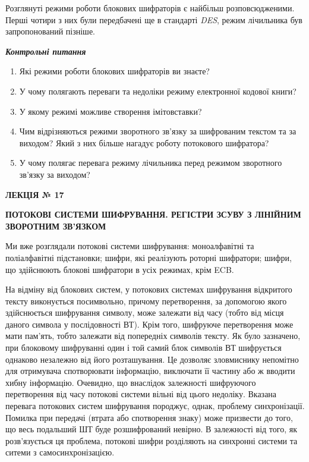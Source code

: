 \bigskip

Розглянуті режими роботи блокових шифраторів є найбільш розповсюдженими. Перші
чотири з них були передбачені ще в стандарті \textit{DES}, режим
лічильника\textit{ }був запропонований пізніше.


\bigskip


\bigskip

{\centering\bfseries\itshape
Контрольні питання
\par}


\bigskip


\bigskip

\liststyleWWviiiNumxx
\begin{enumerate}
\item Які режими роботи блокових шифраторів ви знаєте?
\item У чому полягають переваги та недоліки режиму електронної кодової книги?
\item У якому режимі можливе створення імітовставки?
\item Чим відрізняються режими зворотного зв’язку за шифрованим текстом та за
виходом? Який з них більше нагадує роботу потокового шифратора?
\item У чому полягає перевага режиму лічильника перед режимом  зворотного
зв’язку за виходом?
\end{enumerate}

\bigskip


\bigskip


\bigskip


\bigskip

{\bfseries
ЛЕКЦІЯ № 17}


\bigskip

{\centering\bfseries
ПОТОКОВІ  СИСТЕМИ  ШИФРУВАННЯ.  РЕГІСТРИ ЗСУВУ  З  ЛІНІЙНИМ  ЗВОРОТНИМ  ЗВ’ЯЗКОМ
\par}


\bigskip


\bigskip

Ми вже розглядали потокові системи шифрування: моноалфавітні та поліалфавітні
підстановки; шифри, які реалізують роторні шифратори; шифри, що здійснюють
блокові шифратори в  усіх режимах, крім ECB.

На відміну від блокових систем, у потокових системах шифрування відкритого
тексту виконується посимвольно, причому перетворення, за допомогою якого
здійснюється шифрування символу, може залежати від часу (тобто від місця даного
символа у послідовності ВТ). Крім того, шифруюче перетворення може мати
пам’ять, тобто залежати від попередніх символів тексту. Як було зазначено, при
блоковому шифруванні один і той самий блок символів ВТ шифрується однаково
незалежно від його розташування. Це дозволяє зловмиснику непомітно для
отримувача спотворювати інформацію, виключати її частину або ж вводити хибну
інформацію. Очевидно, що внаслідок залежності шифруючого перетворення від часу
потокові системи вільні від цього недоліку. Вказана перевага потокових систем
шифрування породжує, однак, проблему синхронізації. Помилка при передачі
(втрата або спотворення знаку) може призвести до того, що весь подальший ШТ
буде розшифрований невірно. В залежності від того, як розв’язується ця
проблема, потокові шифри розділяють на синхронні системи та ситеми з
самосинхронізацією.

